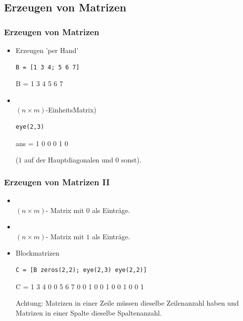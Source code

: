 \documentclass[hyperref={xetex}]{beamer}
\begin{document}
\subsection{Erzeugen von Matrizen}
%
%
\begin{frame}[fragile]\frametitle{Erzeugen von Matrizen}
\begin{itemize}
\item Erzeugen 'per Hand'
\begin{lstlisting}
B = [1 3 4; 5 6 7]
\end{lstlisting}
\begin{matlab}
B =
     1     3     4
     5     6     7 
\end{matlab}

\item {}\\ $(n \times m)$-EinheitsMatrix)
\begin{lstlisting}
eye(2,3)
\end{lstlisting}
\begin{matlab}
ans =
     1     0     0
     0     1     0 
\end{matlab}

($1$ auf der Hauptdiagonalen und 0 sonst).
\end{itemize}
\end{frame} 
%
%
\begin{frame}[fragile]\frametitle{Erzeugen von Matrizen II}
\begin{itemize}
\item {}\\$(n \times m)$- Matrix mit $0$ als Einträge.
\item {}\\$(n \times m)$- Matrix mit $1$ als Einträge.
\item Blockmatrizen
\begin{lstlisting}
C = [B zeros(2,2); eye(2,3) eye(2,2)]
\end{lstlisting}
\begin{matlab}
C =
     1     3     4     0     0
     5     6     7     0     0
     1     0     0     1     0
     0     1     0     0     1 
\end{matlab}

\alert{Achtung:} Matrizen in einer Zeile müssen dieselbe
Zeilenanzahl haben und Matrizen in einer Spalte dieselbe Spaltenanzahl.
\end{itemize}
\end{frame} 
%
%
\end{document}
